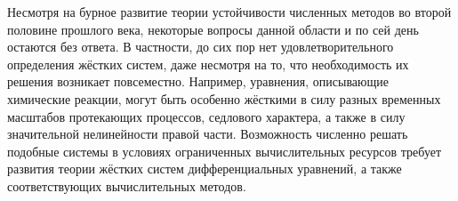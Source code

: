 \label{chapter:summary} 

Несмотря на бурное развитие теории устойчивости численных методов во второй половине прошлого века,
некоторые вопросы данной области и по сей день остаются без ответа.
В частности, до сих пор нет удовлетворительного определения жёстких систем,
даже несмотря на то, что необходимость их решения возникает повсеместно.
Например, уравнения, описывающие химические реакции,
могут быть особенно жёсткими в силу разных временных масштабов протекающих процессов, седлового характера,
а также в силу значительной нелинейности правой части.
Возможность численно решать подобные системы в условиях ограниченных вычислительных ресурсов
требует развития теории жёстких систем дифференциальных уравнений,
а также соответствующих вычислительных методов.

